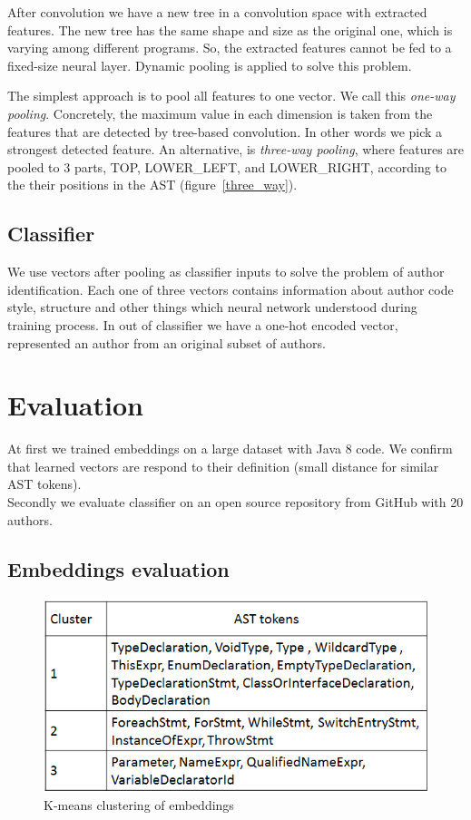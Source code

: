 \documentclass[11pt,technote]{IEEEtran}
\begin{document}
After convolution we have a new tree in a convolution space with extracted features.
The new tree has the same shape and size as the original one, which is varying among
different programs. So, the extracted features cannot be fed to a fixed-size neural layer.
Dynamic pooling \cite{dynamic} is applied to solve this problem.

The simplest approach is to pool all features to one vector. We call this
\textit{one-way pooling}. Concretely, the maximum value in each dimension is taken from the
features that are detected by tree-based convolution. In other words we pick a strongest detected feature. An alternative, is \textit{three-way pooling}, where features are pooled to 3 parts, TOP, LOWER\_LEFT,
and LOWER\_RIGHT, according to the their positions in the AST (figure~\ref{three_way}).


\subsection{Classifier}
We use vectors after pooling as classifier inputs to solve the problem of author identification.
Each one of three vectors contains information about author code style, structure and other things which neural network understood during training process. In out of classifier we have a one-hot encoded vector, represented an author from an original subset of authors.


\section{Evaluation}
At first we trained embeddings on a large dataset with Java 8 code. We confirm that learned vectors are respond 
to their definition (small distance for similar AST tokens).\\
Secondly we evaluate classifier on an open source repository from GitHub with 20 authors.
\subsection{Embeddings evaluation}
\begin{figure}
\includegraphics[scale=0.6]{embed_clust.png}
\caption{K-means clustering of embeddings}
\label{clusters}
\end{figure}
\end{document}
